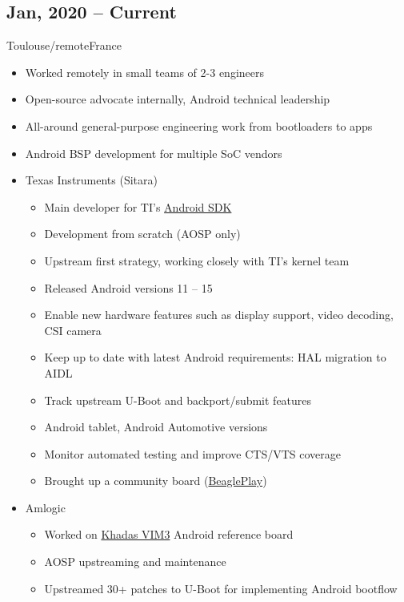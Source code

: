 \documentclass[a4paper,10pt,sans,colorlinks=true]{moderncv}
\begin{document}
\subsection{Jan, 2020 -- Current}
{Toulouse/remote}{France}
{%
  \begin{itemize}
  \item Worked remotely in small teams of 2-3 engineers
  \item Open-source advocate internally, Android technical leadership
  \item All-around general-purpose engineering work from bootloaders to apps
  \item Android BSP development for multiple SoC vendors
  \item Texas Instruments (Sitara)
    \begin{itemize}
    \item Main developer for TI's \href{https://software-dl.ti.com/processor-sdk-android/esd/AM62PX/10_01_00/docs/devices/AM62PX/android/Release_Specific_Release_Notes.html}{Android SDK}
    \item Development from scratch (AOSP only)
    \item Upstream first strategy, working closely with TI's kernel team
    \item Released Android versions 11 -- 15
    \item Enable new hardware features such as display support, video decoding, CSI camera
    \item Keep up to date with latest Android requirements: HAL migration to AIDL
    \item Track upstream U-Boot and backport/submit features
    \item Android tablet, Android Automotive versions
    \item Monitor automated testing and improve CTS/VTS coverage
    \item Brought up a community board (\href{https://www.beagleboard.org/boards/beagleplay}{BeaglePlay})
    \end{itemize}
  \item Amlogic
    \begin{itemize}
    \item Worked on \href{https://source.android.com/docs/setup/create/devices\#vim3board}{Khadas VIM3} Android reference board
    \item AOSP upstreaming and maintenance
    \item Upstreamed 30+ patches to U-Boot for implementing Android bootflow

\end{itemize}
\end{itemize}}
\end{document}
